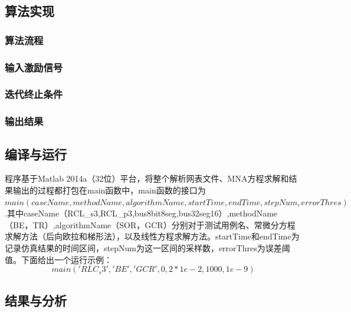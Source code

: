 \documentclass[12pt]{article}
\begin{document}
\subsection{算法实现}
\subsubsection{算法流程}
\subsubsection{输入激励信号}
\subsubsection{迭代终止条件}
\subsubsection{输出结果}

\subsection{编译与运行}
程序基于Matlab 2014a（32位）平台，将整个解析网表文件、MNA方程求解和结果输出的过程都打包在main函数中，main函数的接口为$main(caseName,methodName,algorithmName,startTime,endTime,stepNum,errorThres)$.其中caseName（RCL_s3,RCL_p3,bus8bit8seg,bus32seg16）,methodName（BE，TR）,algorithmName（SOR，GCR）分别对于测试用例名、常微分方程求解方法（后向欧拉和梯形法），以及线性方程求解方法。startTime和endTime为记录仿真结果的时间区间，stepNum为这一区间的采样数，errorThres为误差阈值。下面给出一个运行示例：
\begin{equation}
  main('RLC_s3','BE','GCR',0 ,2*1e-2,1000,1e-9)
\end{equation}


\subsection{结果与分析}

\qquad \par
\qquad \par
\qquad \par
\qquad \par
\qquad \par
\qquad \par
\qquad \par
\qquad \par
\qquad \par
\qquad \par
\qquad \par
\qquad \par
\qquad \par
\qquad \par
\qquad \par
\qquad \par






\end{document}
